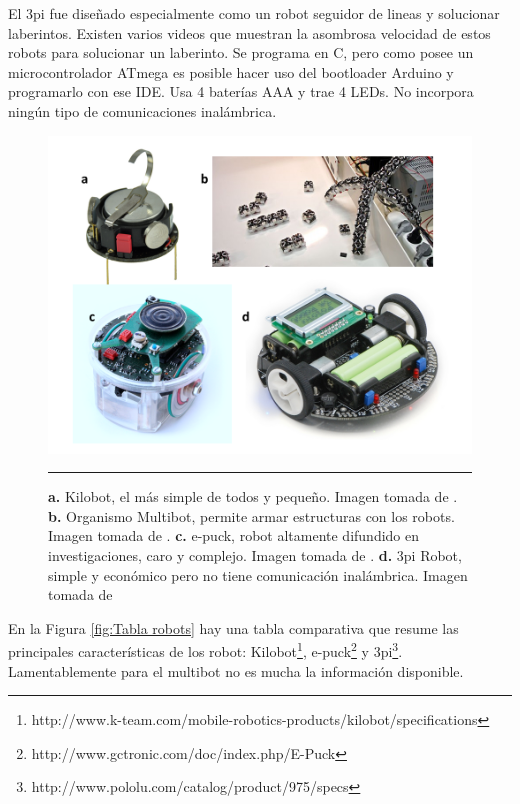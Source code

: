 El 3pi fue diseñado especialmente como un robot seguidor de lineas y solucionar laberintos. Existen varios videos que muestran la asombrosa velocidad de estos robots para solucionar un laberinto. Se programa en C, pero como posee un microcontrolador ATmega es posible hacer uso del bootloader Arduino y programarlo con ese IDE. Usa 4 baterías AAA y trae 4 LEDs. No incorpora ningún tipo de comunicaciones inalámbrica. 


\begin{figure}[htbp]
	\centering
		\includegraphics[width=\textwidth]{./Figures/robots.png}
		\rule{35em}{0.5pt} 
	\caption[Robots estudiados como alternativa para armar un enjambre de robots.]{\textbf{a.} Kilobot, el más simple de todos y pequeño. Imagen tomada de \cite{6224638}. \textbf{b.} Organismo Multibot, permite armar estructuras con los robots. Imagen tomada de \cite{5359578}. \textbf{c.} e-puck, robot altamente difundido en investigaciones, caro y complejo. Imagen tomada de \cite{mondada2009puck}. \textbf{d.} 3pi Robot, simple y económico pero no tiene comunicación inalámbrica. Imagen tomada de \cite{thurskyusing}}
	\label{fig:robots estudiados}
\end{figure}

En la Figura \ref{fig:Tabla robots} hay una tabla comparativa que resume las principales características de los robot: Kilobot\footnote{http://www.k-team.com/mobile-robotics-products/kilobot/specifications}, e-puck\footnote{http://www.gctronic.com/doc/index.php/E-Puck} y 3pi\footnote{http://www.pololu.com/catalog/product/975/specs}. Lamentablemente para el multibot no es mucha la información disponible.

